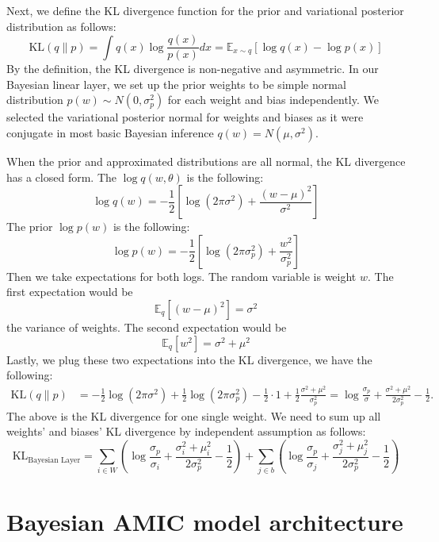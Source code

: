 \documentclass{article}
\begin{document}
Next, we define the KL divergence function for the prior and variational posterior distribution as follows: $$\mathrm{KL}(q \| p)=\int q(x) \log \frac{q(x)}{p(x)} d x=\mathbb{E}_{x \sim q}[\log q(x)-\log p(x)]$$ By the definition, the KL divergence is non-negative and asymmetric. In our Bayesian linear layer, we set up the prior weights to be simple normal distribution $p(w)\sim N(0, \sigma^2_p)$ for each weight and bias independently. We selected the variational posterior normal for weights and biases as it were conjugate in most basic Bayesian inference $q(w)=N(\mu, \sigma^2)$. 

When the prior and approximated distributions are all normal, the KL divergence has a closed form. The $\log q(w,\theta)$ is the following:
$$\log q(w)=-\frac{1}{2}\left[\log \left(2 \pi \sigma^2\right)+\frac{(w-\mu)^2}{\sigma^2}\right]$$ The prior $\log p(w)$ is the following: $$\log p(w)=-\frac{1}{2}\left[\log \left(2 \pi \sigma_p^2\right)+\frac{w^2}{\sigma_p^2}\right]$$ Then we take expectations for both logs. The random variable is weight $w$. The first expectation would be $$\mathbb{E}_q\left[(w-\mu)^2\right]=\sigma^2$$ the variance of weights. The second expectation would be $$\mathbb{E}_q\left[w^2\right]=\sigma^2+\mu^2$$ Lastly, we plug these two expectations into the KL divergence, we have the following: $$\begin{aligned}
\mathrm{KL}(q \| p) & =-\frac{1}{2} \log \left(2 \pi \sigma^2\right)+\frac{1}{2} \log \left(2 \pi \sigma_p^2\right)-\frac{1}{2} \cdot 1+\frac{1}{2} \frac{\sigma^2+\mu^2}{\sigma_p^2} =\log \frac{\sigma_p}{\sigma}+\frac{\sigma^2+\mu^2}{2 \sigma_p^2}-\frac{1}{2} .
\end{aligned}$$ The above is the KL divergence for one single weight. We need to sum up all weights' and biases' KL divergence by independent assumption as follows: 
\begin{equation}
    \mathrm{KL}_{\text {Bayesian Layer}}=\sum_{i \in W}\left(\log \frac{\sigma_p}{\sigma_i}+\frac{\sigma_i^2+\mu_i^2}{2 \sigma_p^2}-\frac{1}{2}\right)+\sum_{j \in b}\left(\log \frac{\sigma_p}{\sigma_j}+\frac{\sigma_j^2+\mu_j^2}{2 \sigma_p^2}-\frac{1}{2}\right)
    \label{eq:KL}
\end{equation}

\section{Bayesian AMIC model architecture}
\end{document}
